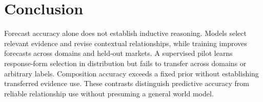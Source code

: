 \section{Conclusion}
\label{sec:conclusion}

Forecast accuracy alone does not establish inductive reasoning. Models select
relevant evidence and revise contextual relationships, while training improves
forecasts across domains and held-out markets. A supervised pilot learns
response-form selection in distribution but fails to transfer across domains or
arbitrary labels. Composition accuracy exceeds a fixed prior without establishing
transferred evidence use. These contrasts distinguish predictive accuracy from
reliable relationship use without presuming a general world model.
